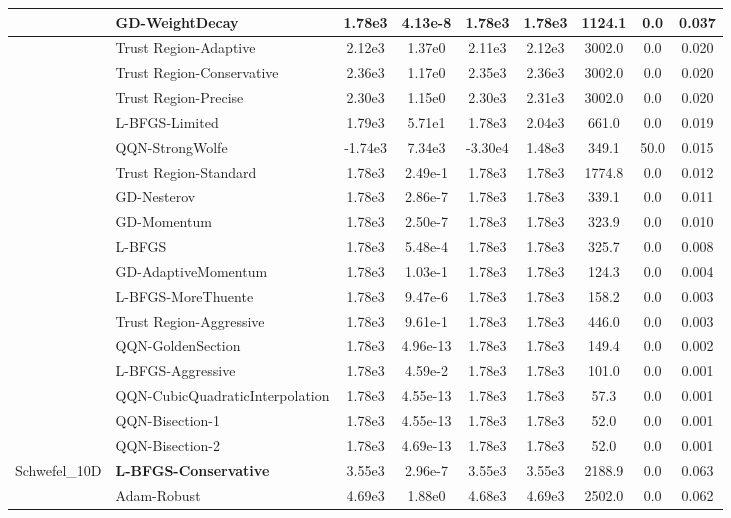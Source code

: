 \documentclass[10pt]{article}
\begin{document}
\begin{longtable}{|l|l|c|c|c|c|c|c|c|}
\hline
 & GD-WeightDecay & 1.78e3 & 4.13e-8 & 1.78e3 & 1.78e3 & 1124.1 & 0.0 & 0.037 \\
\hline
 & Trust Region-Adaptive & 2.12e3 & 1.37e0 & 2.11e3 & 2.12e3 & 3002.0 & 0.0 & 0.020 \\
\hline
 & Trust Region-Conservative & 2.36e3 & 1.17e0 & 2.35e3 & 2.36e3 & 3002.0 & 0.0 & 0.020 \\
\hline
 & Trust Region-Precise & 2.30e3 & 1.15e0 & 2.30e3 & 2.31e3 & 3002.0 & 0.0 & 0.020 \\
\hline
 & L-BFGS-Limited & 1.79e3 & 5.71e1 & 1.78e3 & 2.04e3 & 661.0 & 0.0 & 0.019 \\
\hline
 & QQN-StrongWolfe & -1.74e3 & 7.34e3 & -3.30e4 & 1.48e3 & 349.1 & 50.0 & 0.015 \\
\hline
 & Trust Region-Standard & 1.78e3 & 2.49e-1 & 1.78e3 & 1.78e3 & 1774.8 & 0.0 & 0.012 \\
\hline
 & GD-Nesterov & 1.78e3 & 2.86e-7 & 1.78e3 & 1.78e3 & 339.1 & 0.0 & 0.011 \\
\hline
 & GD-Momentum & 1.78e3 & 2.50e-7 & 1.78e3 & 1.78e3 & 323.9 & 0.0 & 0.010 \\
\hline
 & L-BFGS & 1.78e3 & 5.48e-4 & 1.78e3 & 1.78e3 & 325.7 & 0.0 & 0.008 \\
\hline
 & GD-AdaptiveMomentum & 1.78e3 & 1.03e-1 & 1.78e3 & 1.78e3 & 124.3 & 0.0 & 0.004 \\
\hline
 & L-BFGS-MoreThuente & 1.78e3 & 9.47e-6 & 1.78e3 & 1.78e3 & 158.2 & 0.0 & 0.003 \\
\hline
 & Trust Region-Aggressive & 1.78e3 & 9.61e-1 & 1.78e3 & 1.78e3 & 446.0 & 0.0 & 0.003 \\
\hline
 & QQN-GoldenSection & 1.78e3 & 4.96e-13 & 1.78e3 & 1.78e3 & 149.4 & 0.0 & 0.002 \\
\hline
 & L-BFGS-Aggressive & 1.78e3 & 4.59e-2 & 1.78e3 & 1.78e3 & 101.0 & 0.0 & 0.001 \\
\hline
 & QQN-CubicQuadraticInterpolation & 1.78e3 & 4.55e-13 & 1.78e3 & 1.78e3 & 57.3 & 0.0 & 0.001 \\
\hline
 & QQN-Bisection-1 & 1.78e3 & 4.55e-13 & 1.78e3 & 1.78e3 & 52.0 & 0.0 & 0.001 \\
\hline
 & QQN-Bisection-2 & 1.78e3 & 4.69e-13 & 1.78e3 & 1.78e3 & 52.0 & 0.0 & 0.001 \\
Schwefel\_10D & \textbf{L-BFGS-Conservative} & 3.55e3 & 2.96e-7 & 3.55e3 & 3.55e3 & 2188.9 & 0.0 & 0.063 \\
\hline
 & Adam-Robust & 4.69e3 & 1.88e0 & 4.68e3 & 4.69e3 & 2502.0 & 0.0 & 0.062 \\

\end{longtable}
\end{document}
